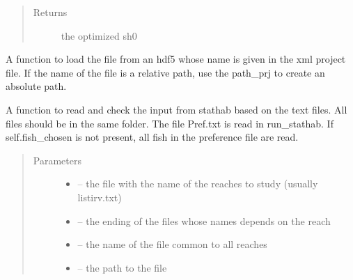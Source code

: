\documentclass[letterpaper,10pt,english]{sphinxmanual}
\begin{document}
\begin{fulllineitems}
\begin{fulllineitems}
\begin{quote}
\begin{description}
\begin{itemize}
\end{itemize}

\item[{Returns}] \leavevmode
the optimized sh0

\end{description}\end{quote}

\end{fulllineitems}


\begin{fulllineitems}
\label{\detokenize{index:src.stathab_c.Stathab.load_stathab_from_hdf5}}
A function to load the file from an hdf5 whose name is given in the xml project file. If the name of the
file is a relative path, use the path\_prj to create an absolute path.

\end{fulllineitems}


\begin{fulllineitems}
\label{\detokenize{index:src.stathab_c.Stathab.load_stathab_from_txt}}
A function to read and check the input from stathab based on the text files.
All files should be in the same folder.
The file Pref.txt is read in run\_stathab.
If self.fish\_chosen is not present, all fish in the preference file are read.
\begin{quote}\begin{description}
\item[{Parameters}] \leavevmode\begin{itemize}
\item {} 
 -- the file with the name of the reaches to study (usually listirv.txt)

\item {} 
 -- the ending of the files whose names depends on the reach

\item {} 
 -- the name of the file common to all reaches

\item {} 
 -- the path to the file


\end{itemize}
\end{description}
\end{quote}
\end{fulllineitems}
\end{fulllineitems}
\end{document}
